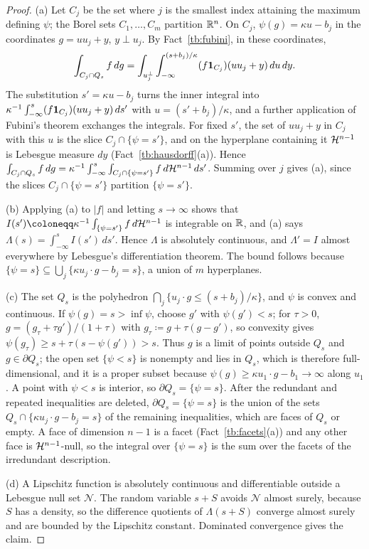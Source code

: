 \begin{proof}
(a) Let \(C_j\) be the set where \(j\) is the smallest index attaining the
maximum defining \(\psi\); the Borel sets \(C_1,\ldots,C_m\) partition
\(\mathbb R^n\). On \(C_j\), \(\psi(g)=\kappa u-b_j\) in the coordinates
\(g=u u_j+y\), \(y\perp u_j\). By Fact~\ref{tb:fubini}, in these coordinates,
\[
 \int_{C_j\cap Q_s}f\,dg=\int_{u_j^\perp}\int_{-\infty}^{(s+b_j)/\kappa}
 (f\mathbf 1_{C_j})(u u_j+y)\,du\,dy .
\]
The substitution \(s'=\kappa u-b_j\) turns the inner integral into
\(\kappa^{-1}\int_{-\infty}^s(f\mathbf 1_{C_j})(u u_j+y)\,ds'\) with
\(u=(s'+b_j)/\kappa\), and a further application of Fubini's theorem
exchanges the integrals. For fixed \(s'\), the set of \(u u_j+y\) in \(C_j\)
with this \(u\) is the slice \(C_j\cap\{\psi=s'\}\), and on the hyperplane
containing it \(\mathcal H^{n-1}\) is Lebesgue measure \(dy\)
(Fact~\ref{tb:hausdorff}(a)). Hence
\(\int_{C_j\cap Q_s}f\,dg=\kappa^{-1}\int_{-\infty}^s\int_{C_j\cap\{\psi=s'\}}
f\,d\mathcal H^{n-1}\,ds'\). Summing over \(j\) gives (a), since the slices
\(C_j\cap\{\psi=s'\}\) partition \(\{\psi=s'\}\).

(b) Applying (a) to \(|f|\) and letting \(s\to\infty\) shows that
\(I(s')\coloneqq \kappa^{-1}\int_{\{\psi=s'\}}f\,d\Haus^{n-1}\) is integrable on
\(\mathbb R\), and (a) says \(\Lambda(s)=\int_{-\infty}^sI(s')\,ds'\). Hence \(\Lambda\) is
absolutely continuous, and \(\Lambda'=I\) almost everywhere by Lebesgue's
differentiation theorem. The bound follows because
\(\{\psi=s\}\subseteq\bigcup_j\{\kappa u_j\cdot g-b_j=s\}\), a union of \(m\)
hyperplanes.

(c) The set \(Q_s\) is the polyhedron \(\bigcap_j\{u_j\cdot g\le(s+b_j)/\kappa\}\),
and \(\psi\) is convex and continuous. If \(\psi(g)=s>\inf\psi\), choose \(g'\)
with \(\psi(g')<s\); for \(\tau>0\), \(g=(g_\tau+\tau g')/(1+\tau)\) with
\(g_\tau\coloneqq g+\tau(g-g')\), so convexity gives
\(\psi(g_\tau)\ge s+\tau(s-\psi(g'))>s\). Thus \(g\) is a limit of points
outside \(Q_s\) and \(g\in\partial Q_s\); the open set \(\{\psi<s\}\) is
nonempty and lies in \(Q_s\), which is therefore full-dimensional, and it
is a proper subset because \(\psi(g)\ge\kappa u_1\cdot g-b_1\to\infty\) along
\(u_1\). A point with \(\psi<s\) is interior, so \(\partial Q_s=\{\psi=s\}\). After
the redundant and repeated inequalities are deleted, \(\partial Q_s=\{\psi=s\}\)
is the union of the sets \(Q_s\cap\{\kappa u_j\cdot g-b_j=s\}\) of the
remaining inequalities, which are faces of \(Q_s\) or empty. A face of
dimension \(n-1\) is a facet (Fact~\ref{tb:facets}(a)) and any other face is
\(\mathcal H^{n-1}\)-null, so the integral over \(\{\psi=s\}\) is the sum over the
facets of the irredundant description.

(d) A Lipschitz function is absolutely continuous and differentiable outside a
Lebesgue null set \(\mathcal N\). The random variable \(s+S\) avoids
\(\mathcal N\) almost surely, because \(S\) has a density, so the difference
quotients of \(\Lambda(s+S)\) converge almost surely and are bounded by the
Lipschitz constant. Dominated convergence gives the claim.
\end{proof}

